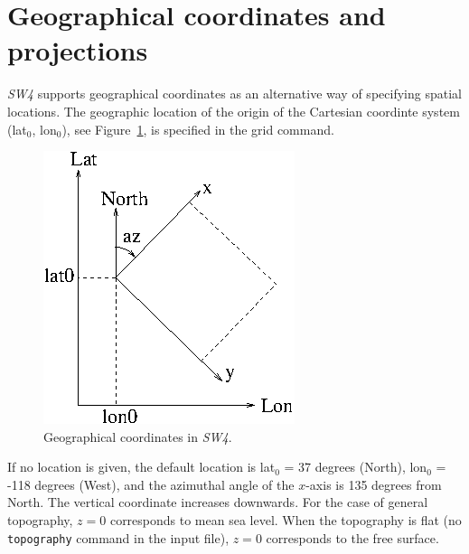 \documentclass[11pt]{report}
\begin{document}
\section{Geographical coordinates and projections}
\emph{SW4} supports geographical coordinates as an alternative way of specifying spatial
locations. The geographic location of the origin of the Cartesian coordinte system (lat$_0$,
lon$_0$), see Figure~\ref{fig:geocoord}, is specified in the grid command. 
\begin{figure}
\begin{centering}
  \includegraphics[width=0.5\linewidth]{latlon.png}
  \caption{Geographical coordinates in \emph{SW4}.}
  \label{fig:geocoord}
\end{centering}
\end{figure}
If no location is given, the default location is lat$_0$ = 37 degrees (North), lon$_0$ = -118
degrees (West), and the azimuthal angle of the $x$-axis is 135 degrees from North. The vertical
coordinate increases downwards. For the case of general topography, $z=0$ corresponds to mean sea
level. When the topography is flat (no {\tt topography} command in the input file), $z=0$
corresponds to the free surface.
\end{document}
